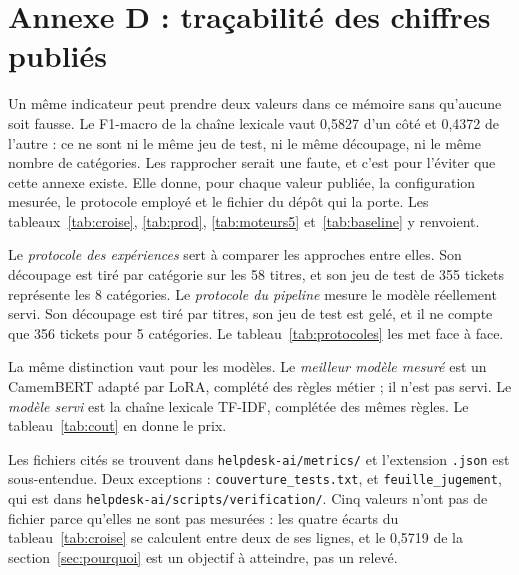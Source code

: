 \FloatBarrier

\section*{Annexe D : traçabilité des chiffres publiés}
\renewcommand{\thetable}{D.\arabic{table}}
\setcounter{table}{0}

Un même indicateur peut prendre deux valeurs dans ce mémoire sans qu'aucune soit fausse. Le
F1-macro de la chaîne lexicale vaut 0,5827 d'un côté et 0,4372 de l'autre : ce ne sont ni le même
jeu de test, ni le même découpage, ni le même nombre de catégories. Les rapprocher serait une
faute, et c'est pour l'éviter que cette annexe existe. Elle donne, pour chaque valeur publiée, la
configuration mesurée, le protocole employé et le fichier du dépôt qui la porte. Les
tableaux~\ref{tab:croise}, \ref{tab:prod}, \ref{tab:moteurs5} et~\ref{tab:baseline} y renvoient.

Le \emph{protocole des expériences} sert à comparer les approches entre elles. Son découpage est
tiré par catégorie sur les 58 titres, et son jeu de test de 355 tickets représente les
8 catégories. Le \emph{protocole du pipeline} mesure le modèle réellement servi. Son découpage est
tiré par titres, son jeu de test est gelé, et il ne compte que 356 tickets pour 5 catégories. Le
tableau~\ref{tab:protocoles} les met face à face.

La même distinction vaut pour les modèles. Le \emph{meilleur modèle mesuré} est un CamemBERT adapté
par LoRA, complété des règles métier ; il n'est pas servi. Le \emph{modèle servi} est la chaîne
lexicale TF-IDF, complétée des mêmes règles. Le tableau~\ref{tab:cout} en donne le prix.

Les fichiers cités se trouvent dans \texttt{helpdesk-ai/metrics/} et l'extension \texttt{.json} est
sous-entendue. Deux exceptions : \texttt{couverture\_tests.txt}, et \texttt{feuille\_jugement}, qui
est dans \texttt{helpdesk-ai/scripts/verification/}. Cinq valeurs n'ont pas de fichier parce
qu'elles ne sont pas mesurées : les quatre écarts du tableau~\ref{tab:croise} se calculent entre
deux de ses lignes, et le 0,5719 de la section~\ref{sec:pourquoi} est un objectif à atteindre, pas
un relevé.

